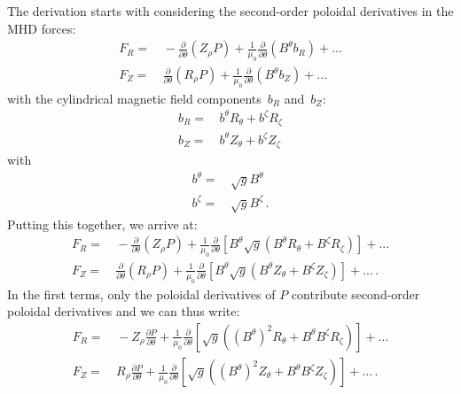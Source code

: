 The derivation starts with considering
the second-order poloidal derivatives in the MHD forces:
\begin{align}
 F_R =&\, -\frac{\partial}{\partial \theta} \left(Z_\rho P \right)
          + \frac{1}{\mu_0} \frac{\partial}{\partial \theta} \left( B^\theta b_R \right)
          + ... \\
 F_Z =&\,  \frac{\partial}{\partial \theta} \left(R_\rho P \right)
          + \frac{1}{\mu_0} \frac{\partial}{\partial \theta} \left( B^\theta b_Z \right)
          + ...
\end{align}
with the cylindrical magnetic field components~$b_R$ and~$b_Z$:
\begin{align}
 b_R =&\, b^\theta R_\theta + b^\zeta R_\zeta \\
 b_Z =&\, b^\theta Z_\theta + b^\zeta Z_\zeta
\end{align}
with
\begin{align}
 b^\theta =&\, \sqrt{g} B^\theta \\
 b^\zeta  =&\, \sqrt{g} B^\zeta  \, .
\end{align}
%
Putting this together, we arrive at:
\begin{align}
 F_R =&\, -\frac{\partial}{\partial \theta} \left(Z_\rho P \right)
          + \frac{1}{\mu_0} \frac{\partial}{\partial \theta} \left[
            B^\theta \sqrt{g} \left( B^\theta R_\theta + B^\zeta R_\zeta \right) \right]
          + ... \\
 F_Z =&\,  \frac{\partial}{\partial \theta} \left(R_\rho P \right)
          + \frac{1}{\mu_0} \frac{\partial}{\partial \theta} \left[
             B^\theta \sqrt{g} \left( B^\theta Z_\theta + B^\zeta Z_\zeta \right) \right]
          + ... \, .
\end{align}
%
In the first terms, only the poloidal derivatives of $P$
contribute second-order poloidal derivatives
and we can thus write:
\begin{align}
 F_R =&\, - Z_\rho \frac{\partial P}{\partial \theta}
          + \frac{1}{\mu_0} \frac{\partial}{\partial \theta}
            \left[ \sqrt{g} \left(   \left( B^\theta \right)^2 R_\theta
                                   + B^\theta B^\zeta          R_\zeta  \right) \right]
          + ... \\
 F_Z =&\,   R_\rho \frac{\partial P}{\partial \theta}
          + \frac{1}{\mu_0} \frac{\partial}{\partial \theta}
            \left[ \sqrt{g} \left(   \left( B^\theta \right)^2 Z_\theta
                                   + B^\theta B^\zeta          Z_\zeta  \right) \right]
          + ... \, .
\end{align}
